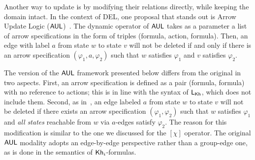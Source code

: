 Another way to update \ltss is by modifying their relations directly, while keeping the domain intact. In the context of DEL, one proposal that stands out is Arrow Update Logic ($\mathsf{AUL}$)~\cite{KooiR11}. The dynamic operator of $\mathsf{AUL}$ takes as a parameter a list of arrow specifications in the form of triples (formula, action, formula). Then, an edge with label $a$ from state $w$ to state $v$ will not be deleted if and only if there is an arrow specification $(\varphi_1, a, \varphi_2)$ such that $w$ satisfies $\varphi_1$ and $v$ satisfies $\varphi_2$. 

The version of the $\mathsf{AUL}$ framework presented below differs from the original in two aspects. First, an arrow specification is defined as a pair (formula, formula) with no reference to actions; this is in line with the syntax of $\mathsf{L}_{\sf Kh}$, which does not include them. 
Second, as in~, an edge labeled $a$ from state $w$ to state $v$ will not be deleted if there exists an arrow specification $(\varphi_1, \varphi_2)$ such that $w$ satisfies $\varphi_1$ and \emph{all states} reachable from $w$ via $a$-edges satisfy $\varphi_2$. The reason for this modification is similar to the one we discussed for the $[\chi]$ operator. The original $\mathsf{AUL}$ modality adopts an edge-by-edge perspective rather than a group-edge one, as is done in the semantics of ${\sf Kh}_i$-formulas.




